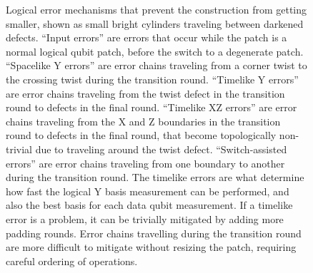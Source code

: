 \documentclass[onecolumn,unpublished,a4paper]{quantumarticle}
\theoremstyle{definition}
\theoremstyle{definition}
\theoremstyle{definition}
\begin{document}
\begin{figure}
    \centering
    \caption{
        Logical error mechanisms that prevent the construction from getting smaller, shown as small bright cylinders traveling between darkened defects.
        ``Input errors'' are errors that occur while the patch is a normal logical qubit patch, before the switch to a degenerate patch.
        ``Spacelike Y errors'' are error chains traveling from a corner twist to the crossing twist during the transition round.
        ``Timelike Y errors'' are error chains traveling from the twist defect in the transition round to defects in the final round.
        ``Timelike XZ errors'' are error chains traveling from the X and Z boundaries in the transition round to defects in the final round, that become topologically non-trivial due to traveling around the twist defect.
        ``Switch-assisted errors'' are error chains traveling from one boundary to another during the transition round.
        The timelike errors are what determine how fast the logical Y basis measurement can be performed, and also the best basis for each data qubit measurement.
        If a timelike error is a problem, it can be trivially mitigated by adding more padding rounds.
        Error chains travelling during the transition round are more difficult to mitigate without resizing the patch, requiring careful ordering of operations.
    }
    \label{fig:logical_error_paths}
\end{figure}
\end{document}
